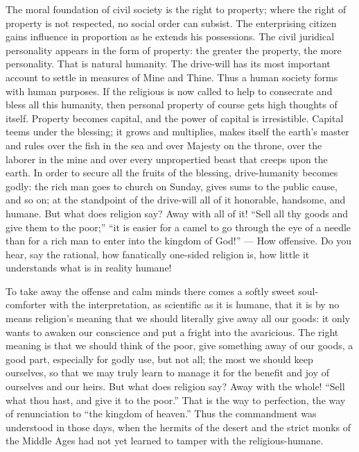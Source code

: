 \documentclass[12pt,a4paper,openany]{book}
\newcommand{\opage}[1]{\marginnote{\footnotesize\textit{[#1]}}}
\begin{document}
The moral foundation of civil society is the right
to property; where the right of property is not respected, no
social order can subsist. The enterprising citizen gains influence
in proportion as he extends his possessions.
The civil juridical personality appears in the form
of property: the greater the property, the more personality.
That is natural humanity. The drive-will has its most important
account to settle in measures of Mine and Thine. Thus
a human society forms with human purposes. If
the religious is now called to help to consecrate and bless all
this humanity, then personal property of course gets
high thoughts of itself. Property becomes capital,
and the power of capital is irresistible. Capital teems
under the blessing; it grows and multiplies, makes itself
the earth's master and rules over the fish in the sea and
over Majesty on the throne, over the laborer in the mine
and over every unpropertied beast that creeps upon the earth.
In order to secure all the fruits of the blessing, drive-humanity
becomes godly: the rich man goes to church on
\setcounter{footnote}{0}%
\opage{78}Sunday, gives sums to the public cause, and so on; at the
standpoint of the drive-will all of it honorable, handsome, and
humane. But what does religion say? Away with all of it!
``Sell all thy goods and give them to the poor;''
``it is easier for a camel to go through the eye of a needle
than for a rich man to enter into the kingdom of God!'' --- How offensive.
Do you hear, say the rational, how fanatically
one-sided religion is, how little it understands
what is in reality humane!

To take away the offense and calm minds
there comes a softly sweet soul-comforter with the interpretation, as scientific
as it is humane, that it is by no means
religion's meaning that we should literally give away all
our goods: it only wants to awaken our conscience and
put a fright into the avaricious. The right meaning is
that we should think of the poor, give something away of our goods,
a good part, especially for godly use, but not all; the
most we should keep ourselves, so that we may truly learn to manage
it for the benefit and joy of ourselves and our heirs.
But what does religion say? Away with the whole! ``Sell
what thou hast, and give it to the poor.'' That is the way
to perfection, the way of renunciation to ``the kingdom
of heaven.'' Thus the commandment was understood in those days, when
the hermits of the desert and the strict monks of the Middle Ages had not yet
learned to tamper with the religious-humane.
\end{document}
